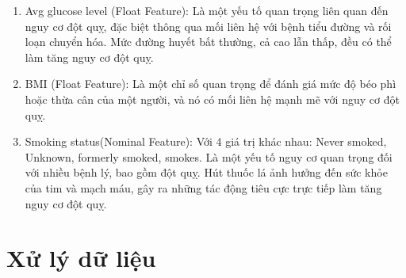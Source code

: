 \documentclass[11pt]{article}
\begin{document}
\begin{enumerate}
		\item Avg glucose level (Float Feature): Là một yếu tố quan trọng liên quan đến nguy cơ đột quỵ, đặc biệt thông qua mối liên hệ với bệnh tiểu đường và rối loạn chuyển hóa. Mức đường huyết bất thường, cả cao lẫn thấp, đều có thể làm tăng nguy cơ đột quỵ.
		\item BMI (Float Feature): Là một chỉ số quan trọng để đánh giá mức độ béo phì hoặc thừa cân của một người, và nó có mối liên hệ mạnh mẽ với nguy cơ đột quỵ.
		\item Smoking status(Nominal Feature): Với 4 giá trị khác nhau: Never smoked, Unknown, formerly smoked, smokes. Là một yếu tố nguy cơ quan trọng đối với nhiều bệnh lý, bao gồm đột quỵ. Hút thuốc lá ảnh hưởng đến sức khỏe của tim và mạch máu, gây ra những tác động tiêu cực trực tiếp làm tăng nguy cơ đột quỵ. 
	\end{enumerate}
	
	\pagebreak
	
	\section{Xử lý dữ liệu}
	
\end{document}
